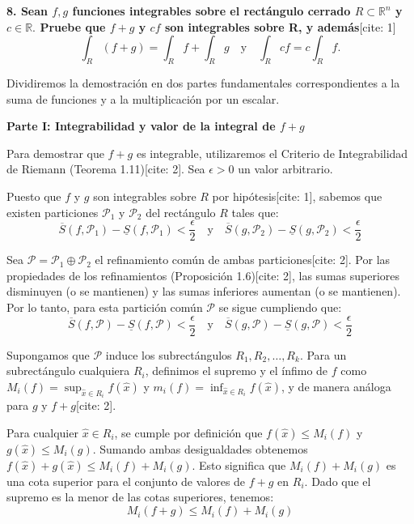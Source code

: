 \documentclass[11pt,letterpaper]{article}
\begin{document}
\textbf{8. Sean $f,g$ funciones integrables sobre el rectángulo cerrado $R\subset\mathbb{R}^{n}$ y $c\in\mathbb{R}.$ Pruebe que $f+g$ y $cf$ son integrables sobre R, y además}[cite: 1]
\begin{equation*}
\int_{R}(f+g)=\int_{R}f+\int_{R}g \quad \text{y} \quad \int_{R}cf=c\int_{R}f.
\end{equation*}

Dividiremos la demostración en dos partes fundamentales correspondientes a la suma de funciones y a la multiplicación por un escalar.

\vspace{0.5cm}
\textbf{Parte I: Integrabilidad y valor de la integral de $f+g$}

Para demostrar que $f+g$ es integrable, utilizaremos el Criterio de Integrabilidad de Riemann (Teorema 1.11)[cite: 2]. Sea $\epsilon > 0$ un valor arbitrario. 

Puesto que $f$ y $g$ son integrables sobre $R$ por hipótesis[cite: 1], sabemos que existen particiones $\mathcal{P}_{1}$ y $\mathcal{P}_{2}$ del rectángulo $R$ tales que:
\begin{equation*}
\overline{S}(f,\mathcal{P}_{1}) - \underline{S}(f,\mathcal{P}_{1}) < \frac{\epsilon}{2} \quad \text{y} \quad \overline{S}(g,\mathcal{P}_{2}) - \underline{S}(g,\mathcal{P}_{2}) < \frac{\epsilon}{2}
\end{equation*}

Sea $\mathcal{P} = \mathcal{P}_{1} \oplus \mathcal{P}_{2}$ el refinamiento común de ambas particiones[cite: 2]. Por las propiedades de los refinamientos (Proposición 1.6)[cite: 2], las sumas superiores disminuyen (o se mantienen) y las sumas inferiores aumentan (o se mantienen). Por lo tanto, para esta partición común $\mathcal{P}$ se sigue cumpliendo que:
\begin{equation*}
\overline{S}(f,\mathcal{P}) - \underline{S}(f,\mathcal{P}) < \frac{\epsilon}{2} \quad \text{y} \quad \overline{S}(g,\mathcal{P}) - \underline{S}(g,\mathcal{P}) < \frac{\epsilon}{2}
\end{equation*}

Supongamos que $\mathcal{P}$ induce los subrectángulos $R_{1}, R_{2}, \dots, R_{k}$. Para un subrectángulo cualquiera $R_{i}$, definimos el supremo y el ínfimo de $f$ como $M_{i}(f) = \sup_{\hat{x} \in R_{i}} f(\hat{x})$ y $m_{i}(f) = \inf_{\hat{x} \in R_{i}} f(\hat{x})$, y de manera análoga para $g$ y $f+g$[cite: 2]. 

Para cualquier $\hat{x} \in R_{i}$, se cumple por definición que $f(\hat{x}) \le M_{i}(f)$ y $g(\hat{x}) \le M_{i}(g)$. Sumando ambas desigualdades obtenemos $f(\hat{x}) + g(\hat{x}) \le M_{i}(f) + M_{i}(g)$. Esto significa que $M_{i}(f) + M_{i}(g)$ es una cota superior para el conjunto de valores de $f+g$ en $R_{i}$. Dado que el supremo es la menor de las cotas superiores, tenemos:
\begin{equation*}
M_{i}(f+g) \le M_{i}(f) + M_{i}(g)
\end{equation*}
\end{document}
